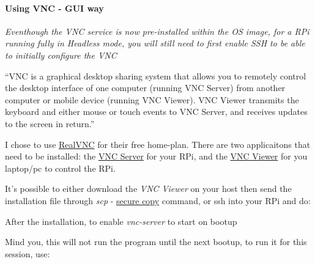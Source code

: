 \hypertarget{using-vnc---gui-way}{%
\paragraph{Using VNC - GUI way}\label{using-vnc---gui-way}}

\emph{Eventhough the VNC service is now pre-installed within the OS
image, for a RPi running fully in Headless mode, you will still need to
first enable SSH to be able to initially configure the VNC}

``VNC is a graphical desktop sharing system that allows you to remotely
control the desktop interface of one computer (running VNC Server) from
another computer or mobile device (running VNC Viewer). VNC Viewer
transmits the keyboard and either mouse or touch events to VNC Server,
and receives updates to the screen in return.''

I chose to use \href{https://www.realvnc.com/en/connect/home/}{RealVNC}
for their free home-plan. There are two applicaitons that need to be
installed: the
\href{https://www.realvnc.com/en/connect/download/vnc/}{VNC Server} for
your RPi, and the
\href{https://www.realvnc.com/en/connect/download/viewer/\%22}{VNC
Viewer} for you laptop/pc to control the RPi.

It's possible to either download the \emph{VNC Viewer} on your host then
send the installation file through \emph{scp} -
\href{https://manpages.ubuntu.com/manpages/bionic/en/man1/scp.1.html}{secure
copy} command, or ssh into your RPi and do:

\begin{Shaded}
\begin{Highlighting}[]
\ExtensionTok{$}
\ExtensionTok{$}
\end{Highlighting}
\end{Shaded}

After the installation, to enable \emph{vnc-server} to start on bootup

\begin{Shaded}
\begin{Highlighting}[]
\ExtensionTok{$}
\end{Highlighting}
\end{Shaded}

Mind you, this will not run the program until the next bootup, to run it
for this session, use:

\begin{Shaded}
\begin{Highlighting}[]
\ExtensionTok{$}
\end{Highlighting}
\end{Shaded}

